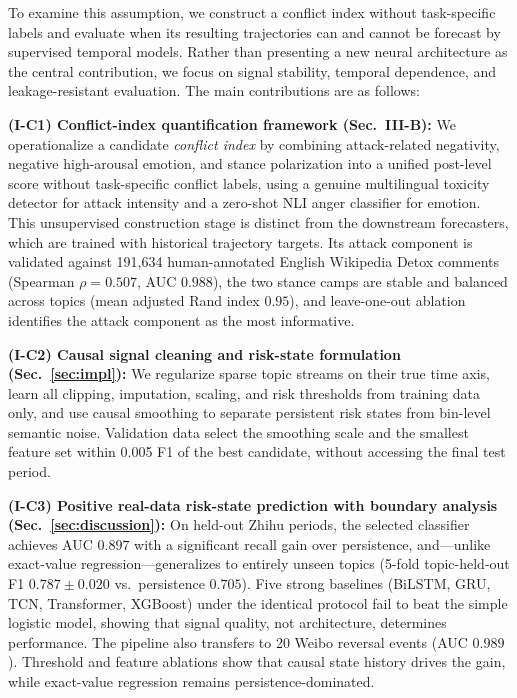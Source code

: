 \documentclass[journal]{IEEEtran}
\begin{document}
To examine this assumption, we construct a conflict index without task-specific labels and evaluate when its resulting trajectories can and cannot be forecast by supervised temporal models. Rather than presenting a new neural architecture as the central contribution, we focus on signal stability, temporal dependence, and leakage-resistant evaluation. The main contributions are as follows:

\noindent\textbf{(I-C1) Conflict-index quantification framework (Sec.~III-B):}
We operationalize a candidate \emph{conflict index} by combining attack-related negativity, negative high-arousal emotion, and stance polarization into a unified post-level score without task-specific conflict labels, using a genuine multilingual toxicity detector for attack intensity and a zero-shot NLI anger classifier for emotion. This unsupervised construction stage is distinct from the downstream forecasters, which are trained with historical trajectory targets. Its attack component is validated against 191,634 human-annotated English Wikipedia Detox comments (Spearman $\rho=0.507$, AUC $0.988$), the two stance camps are stable and balanced across topics (mean adjusted Rand index $0.95$), and leave-one-out ablation identifies the attack component as the most informative.

\noindent\textbf{(I-C2) Causal signal cleaning and risk-state formulation (Sec.~\ref{sec:impl}):}
We regularize sparse topic streams on their true time axis, learn all clipping, imputation, scaling, and risk thresholds from training data only, and use causal smoothing to separate persistent risk states from bin-level semantic noise. Validation data select the smoothing scale and the smallest feature set within 0.005 F1 of the best candidate, without accessing the final test period.

\noindent\textbf{(I-C3) Positive real-data risk-state prediction with boundary analysis (Sec.~\ref{sec:discussion}):}
On held-out Zhihu periods, the selected classifier achieves AUC $0.897$ with a significant recall gain over persistence, and---unlike exact-value regression---generalizes to entirely unseen topics (5-fold topic-held-out F1 $0.787\pm0.020$ vs.\ persistence $0.705$). Five strong baselines (BiLSTM, GRU, TCN, Transformer, XGBoost) under the identical protocol fail to beat the simple logistic model, showing that signal quality, not architecture, determines performance. The pipeline also transfers to 20 Weibo reversal events (AUC $0.989$). Threshold and feature ablations show that causal state history drives the gain, while exact-value regression remains persistence-dominated.
\end{document}
